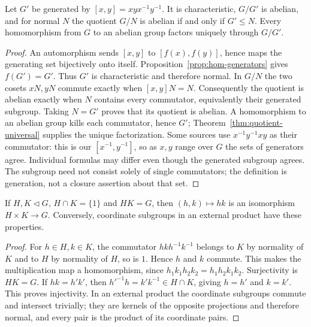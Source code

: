 \begin{theorem}\label{thm:abelianization}
Let $G'$ be generated by $[x,y]=xyx^{-1}y^{-1}$. It is characteristic, $G/G'$ is abelian, and for normal $N$ the quotient $G/N$ is abelian if and only if $G'\leq N$. Every homomorphism from $G$ to an abelian group factors uniquely through $G/G'$.
\end{theorem}
\begin{proof}
An automorphism sends $[x,y]$ to $[f(x),f(y)]$, hence maps the generating set bijectively onto itself. Proposition~\ref{prop:hom-generators} gives $f(G')=G'$. Thus $G'$ is characteristic and therefore normal. In $G/N$ the two cosets $xN,yN$ commute exactly when $[x,y]N=N$. Consequently the quotient is abelian exactly when $N$ contains every commutator, equivalently their generated subgroup. Taking $N=G'$ proves that its quotient is abelian. A homomorphism to an abelian group kills each commutator, hence $G'$; Theorem~\ref{thm:quotient-universal} supplies the unique factorization. Some sources use $x^{-1}y^{-1}xy$ as their commutator: this is our $[x^{-1},y^{-1}]$, so as $x,y$ range over $G$ the sets of generators agree. Individual formulas may differ even though the generated subgroup agrees. The subgroup need not consist solely of single commutators; the definition is generation, not a closure assertion about that set.
\end{proof}

\begin{theorem}\label{thm:internal-direct-product}
If $H,K\mathrel{\triangleleft}G$, $H\cap K=\{1\}$ and $HK=G$, then $(h,k)\mapsto hk$ is an isomorphism $H\times K\to G$. Conversely, coordinate subgroups in an external product have these properties.
\end{theorem}
\begin{proof}
For $h\in H,k\in K$, the commutator $hkh^{-1}k^{-1}$ belongs to $K$ by normality of $K$ and to $H$ by normality of $H$, so is $1$. Hence $h$ and $k$ commute. This makes the multiplication map a homomorphism, since $h_1k_1h_2k_2=h_1h_2k_1k_2$. Surjectivity is $HK=G$. If $hk=h'k'$, then $h'^{-1}h=k'k^{-1}\in H\cap K$, giving $h=h'$ and $k=k'$. This proves injectivity. In an external product the coordinate subgroups commute and intersect trivially; they are kernels of the opposite projections and therefore normal, and every pair is the product of its coordinate pairs.
\end{proof}

